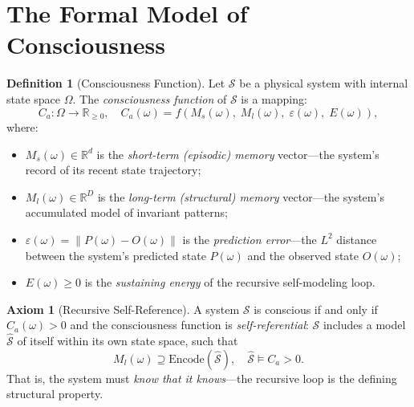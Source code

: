 \documentclass[12pt, a4paper]{article}
\theoremstyle{plain}
\theoremstyle{definition}
\newtheorem{definition}[theorem]{Definition}
\newtheorem{axiom}[theorem]{Axiom}
\theoremstyle{remark}
\newcommand{\R}{\mathbb{R}}
\newcommand{\calS}{\mathcal{S}}
\begin{document}
\section{The Formal Model of Consciousness}\label{sec:formal_model}

\begin{definition}[Consciousness Function]\label{def:consciousness}
  Let $\calS$ be a physical system with internal state space $\Omega$. The
  \emph{consciousness function} of $\calS$ is a mapping:
  \begin{equation}\label{eq:ca}
    C_a : \Omega \to \R_{\geq 0}, \quad
    C_a(\omega) = f\!\left(M_s(\omega),\; M_l(\omega),\;
    \varepsilon(\omega),\; E(\omega)\right),
  \end{equation}
  where:
  \begin{itemize}
    \item $M_s(\omega) \in \R^d$ is the \emph{short-term (episodic) memory}
      vector---the system's record of its recent state trajectory;
    \item $M_l(\omega) \in \R^D$ is the \emph{long-term (structural) memory}
      vector---the system's accumulated model of invariant patterns;
    \item $\varepsilon(\omega) = \|P(\omega) - O(\omega)\|$ is the
      \emph{prediction error}---the $L^2$ distance between the system's
      predicted state $P(\omega)$ and the observed state $O(\omega)$;
    \item $E(\omega) \geq 0$ is the \emph{sustaining energy} of the
      recursive self-modeling loop.
  \end{itemize}
\end{definition}

\begin{axiom}[Recursive Self-Reference]\label{ax:recursion}
  A system $\calS$ is conscious if and only if $C_a(\omega) > 0$ and the
  consciousness function is \emph{self-referential}: $\calS$ includes a
  model $\hat{\calS}$ of itself within its own state space, such that
  \begin{equation}\label{eq:self_ref}
    M_l(\omega) \supseteq \text{Encode}(\hat{\calS}), \quad
    \hat{\calS} \models C_a > 0.
  \end{equation}
  That is, the system must \emph{know that it knows}---the recursive loop
  is the defining structural property.
\end{axiom}
\end{document}
